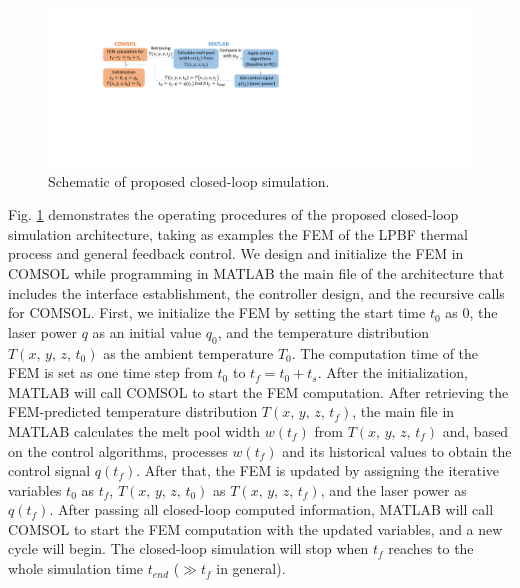 \documentclass [11pt, proquest] {uwthesis}[2020/02/24]
\begin{document}
\begin{figure}[!ht]
\begin{centering}
\includegraphics[clip,width=13cm]{Closed-loop-simulation/closedloop_comsol_matlab_2}
\par\end{centering}
\centering{}\caption{\label{fig:Schematic-of-proposed}Schematic of proposed closed-loop
simulation.}
\end{figure}
Fig. \ref{fig:Schematic-of-proposed} demonstrates the operating procedures
of the proposed closed-loop simulation architecture, taking as examples
the FEM of the LPBF thermal process and general feedback control. We
design and initialize the FEM in COMSOL while programming in MATLAB
the main file of the architecture that includes the interface establishment,
the controller design, and the recursive calls for COMSOL. First,
we initialize the FEM by setting the start time $t_{0}$ as 0, the
laser power $q$ as an initial value $q_{0}$, and the temperature
distribution $T(x,\,y,\,z,\,t_{0})$ as the ambient temperature $T_{0}$.
The computation time of the FEM is set as one time step from $t_{0}$
to $t_{f}=t_{0}+t_{s}$. After the initialization, MATLAB will call
COMSOL to start the FEM computation. After retrieving the FEM-predicted
temperature distribution $T(x,\,y,\,z,\,t_{f})$, the main file in
MATLAB calculates the melt pool width $w(t_{f})$ from $T(x,\,y,\,z,\,t_{f})$
and, based on the control algorithms, processes $w(t_{f})$ and its
historical values to obtain the control signal $q(t_{f})$. After
that, the FEM is updated by assigning the iterative variables $t_{0}$
as $t_{f}$, $T(x,\,y,\,z,\,t_{0})$ as $T(x,\,y,\,z,\,t_{f})$, and
the laser power as $q(t_{f})$. After passing all closed-loop computed
information, MATLAB will call COMSOL to start the FEM computation
with the updated variables, and a new cycle will begin. The closed-loop
simulation will stop when $t_{f}$ reaches to the whole simulation
time $t_{end}$ ($\gg t_{f}$ in general).
\end{document}
